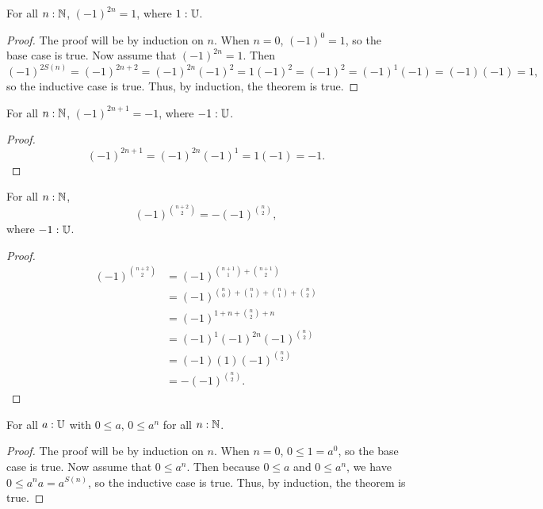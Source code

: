 \documentclass[../../math.tex]{subfiles}
\begin{document}
\begin{theorem} \label{nat_pow_neg_even}
    For all $n : \mathbb{N}$, $(-1)^{2n} = 1$, where $1 : \mathbb{U}$.
\end{theorem}
\begin{proof}
    The proof will be by induction on $n$.  When $n = 0$, $(-1)^0 = 1$, so the
    base case is true.  Now assume that $(-1)^{2n} = 1$.  Then
    \[
        (-1)^{2S(n)} = (-1)^{2n + 2} = (-1)^{2n} (-1)^2 = 1 (-1)^2 = (-1)^2 =
        (-1)^1 (-1) = (-1) (-1) = 1,
    \]
    so the inductive case is true.  Thus, by induction, the theorem is true.
\end{proof}

\begin{theorem} \label{nat_pow_neg_odd}
    For all $n : \mathbb{N}$, $(-1)^{2n + 1} = -1$, where $-1 : \mathbb{U}$.
\end{theorem}
\begin{proof}
    \[
        (-1)^{2n + 1} = (-1)^{2n} (-1)^1 = 1 (-1) = -1.
    \]
\end{proof}

\begin{theorem} \label{nat_pow_neg_binom2}
    For all $n : \mathbb{N}$,
    \[
        (-1)^{\binom{n + 2}{2}} = -(-1)^{\binom{n}{2}},
    \]
    where $-1 : \mathbb{U}$.
\end{theorem}
\begin{proof}
    \begin{align*}
        (-1)^{\binom{n + 2}{2}}
        &= (-1)^{\binom{n + 1}{1} + \binom{n + 1}{2}} \\
        &= (-1)^{\binom{n}{0} + \binom{n}{1} + \binom{n}{1} + \binom{n}{2}} \\
        &= (-1)^{1 + n + \binom{n}{2} + n} \\
        &= (-1)^{1} (-1)^{2n} (-1)^{\binom{n}{2}} \\
        &= (-1) (1) (-1)^{\binom{n}{2}} \\
        &= -(-1)^{\binom{n}{2}}.
    \end{align*}
\end{proof}

\begin{theorem} \label{nat_pow_pos}
    For all $a : \mathbb{U}$ with $0 \leq a$, $0 \leq a^n$ for all $n : \mathbb{N}$.
\end{theorem}
\begin{proof}
    The proof will be by induction on $n$.  When $n = 0$, $0 \leq 1 = a^0$, so
    the base case is true.  Now assume that $0 \leq a^n$.  Then because $0 \leq
    a$ and $0 \leq a^n$, we have $0 \leq a^na = a^{S(n)}$, so the inductive case
    is true.  Thus, by induction, the theorem is true.
\end{proof}
\end{document}
